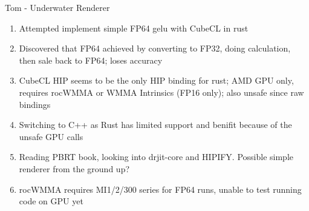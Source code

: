 \begin{frame}{Tom - Underwater Renderer}
    \begin{enumerate}
	    \item Attempted implement simple FP64 gelu with CubeCL in rust
      \item Discovered that FP64 achieved by converting to FP32, doing calculation, then sale back to FP64; loses accuracy
      \item CubeCL HIP seems to be the only HIP binding for rust; AMD GPU only, requires rocWMMA or WMMA Intrinsics (FP16 only); also unsafe since raw bindings
      \item Switching to C++ as Rust has limited support and benifit because of the unsafe GPU calls
      \item Reading PBRT book, looking into drjit-core and HIPIFY. Possible simple renderer from the ground up?
      \item rocWMMA requires MI1/2/300 series for FP64 runs, unable to test running code on GPU yet
    \end{enumerate}
\end{frame}
